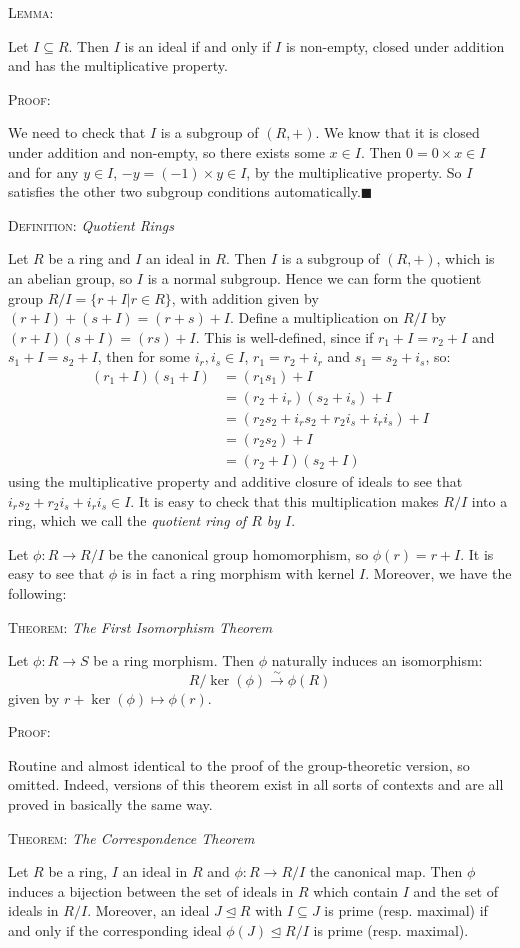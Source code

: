 \documentclass[12pt,a4paper]{article}
\newcommand{\proof}{\noindent\textsc{\large Proof:}\par}
\newcommand{\defn}[1]{\noindent\textsc{\large Definition:}  \textit{\large #1}\par}
\newcommand{\thm}[1]{\noindent\textsc{\large Theorem:}  \textit{\large #1}\par}
\newcommand{\lemma}[1]{\noindent\textsc{\large Lemma:}  \textit{\large #1}\par}
\newcommand{\qed}{\hfill$\blacksquare$\gap}
\newcommand{\gap}{\par \vspace{5mm}}
\let\ideal\trianglelefteq
\begin{document}
\lemma{}
Let $I\subseteq R$. Then $I$ is an ideal if and only if $I$ is non-empty, closed under addition and has the multiplicative property.\gap

\proof
We need to check that $I$ is a subgroup of $(R,+)$. We know that it is closed under addition and non-empty, so there exists some $x\in I$. Then $0=0\times x\in I$ and for any $y\in I$, $-y=(-1)\times y\in I$, by the multiplicative property. So $I$ satisfies the other two subgroup conditions automatically.\qed

\defn{Quotient Rings}
Let $R$ be a ring and $I$ an ideal in $R$. Then $I$ is a subgroup of $(R,+)$, which is an abelian group, so $I$ is a normal subgroup. Hence we can form the quotient group $R/I=\{r+I | r\in R\}$, with addition given by $(r+I)+(s+I)=(r+s)+I$. Define a multiplication on $R/I$ by $(r+I)(s+I)=(rs)+I$. This is well-defined, since if $r_1+I=r_2+I$ and $s_1+I=s_2+I$, then for some $i_r,i_s\in I$, $r_1=r_2+i_r$ and $s_1=s_2+i_s$, so:
\begin{align*}
(r_1+I)(s_1+I) &= (r_1s_1)+I\\
&= (r_2+i_r)(s_2+i_s)+I\\
&= (r_2s_2+i_rs_2+r_2i_s+i_ri_s)+I\\
&= (r_2s_2)+I\\
&= (r_2+I)(s_2+I)
\end{align*}
using the multiplicative property and additive closure of ideals to see that $i_rs_2+r_2i_s+i_ri_s\in I$. It is easy to check that this multiplication makes $R/I$ into a ring, which we call the \textit{quotient ring of $R$ by $I$}.

Let $\phi:R\to R/I$ be the canonical group homomorphism, so $\phi(r)=r+I$. It is easy to see that $\phi$ is in fact a ring morphism with kernel $I$. Moreover, we have the following:\gap

\thm{The First Isomorphism Theorem}
Let $\phi:R\to S$ be a ring morphism. Then $\phi$ naturally induces an isomorphism:
$$R/\ker(\phi)\xrightarrow{\sim}\phi(R)$$
given by $r+\ker(\phi)\mapsto \phi(r)$.\gap

\proof Routine and almost identical to the proof of the group-theoretic version, so omitted. Indeed, versions of this theorem exist in all sorts of contexts and are all proved in basically the same way.\gap

\thm{The Correspondence Theorem}
Let $R$ be a ring, $I$ an ideal in $R$ and $\phi:R\to R/I$ the canonical map. Then $\phi$ induces a bijection between the set of ideals in $R$ which contain $I$ and the set of ideals in $R/I$. Moreover, an ideal $J\ideal R$ with $I\subseteq J$ is prime (resp. maximal) if and only if the corresponding ideal $\phi(J)\ideal R/I$ is prime (resp. maximal).\gap
\end{document}
